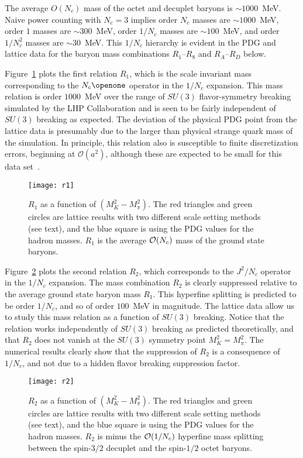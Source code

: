 \documentclass[twocolumn,nofootinbib,prd,aps,superscriptaddress,tightenlines]{revtex4}
\def\N{N_c}
\def\mc#1{{\mathcal{#1}}}
\begin{document}
The average $O(N_c)$ mass of the octet and decuplet baryons is $\sim\!1000$~MeV.  Naive power counting with $N_c=3$ implies order $N_c$ masses  are $\sim\! 1000$~MeV, order $1$ masses are $\sim\!300$~MeV,
order $1/N_c$ masses are $\sim\!100$~MeV,  and order $1/N_c^2$ masses are $\sim\!30$~MeV.  This $1/N_c$ hierarchy is evident in the PDG and lattice data for the baryon mass combinations $R_1$--$R_8$ and $R_A$--$R_D$ below.

Figure~\ref{fig:r1} plots the first relation $R_1$, which is the scale invariant mass corresponding to the $N_c \openone$ operator in the $1/N_c$ expansion.  This mass relation is order $1000$~MeV over the range of $SU(3)$ flavor-symmetry breaking simulated by the LHP Collaboration and is seen to be fairly independent of $SU(3)$ breaking as expected.  The deviation of the physical PDG point from the lattice data is presumably due to the larger than physical strange quark mass
of the simulation.  In principle, this relation also is susceptible to finite discretization errors, beginning at $\mc{O}(a^2)$, although these are expected to be small for this data set~\cite{WalkerLoud:2008bp}.
\begin{figure}
\texttt{[image: r1]}
\caption{$R_1$ as a function of $(M_K^2 - M_\pi^2)$. The red triangles and green circles are lattice results with two different scale setting methods (see text), and the blue square is using the PDG values for the hadron masses. $R_1$ is the average ${\cal O}(N_c)$ mass of the ground state baryons. \label{fig:r1}}
\end{figure}


Figure~\ref{fig:r2} plots the second relation $R_2$, which corresponds to the $J^2/N_c$ operator in the $1/N_c$ expansion.  The mass combination $R_2$ is clearly suppressed relative to the average ground state baryon mass $R_1$. This hyperfine splitting is predicted to be order $1/\N$, and so of order $100$~MeV in magnitude. The lattice data allow us to study this mass relation as a function of $SU(3)$ breaking. Notice that the relation works independently of $SU(3)$ breaking as predicted theoretically, and that $R_2$ does not vanish at the $SU(3)$ symmetry point $M_K^2=M_\pi^2$. The numerical results clearly show that the suppression of $R_2$ is a consequence of $1/N_c$, and not due to a hidden flavor breaking suppression factor.
\begin{figure}
\texttt{[image: r2]}
\caption{$R_2$ as a function of $(M_K^2 - M_\pi^2)$. The red triangles and green circles are lattice results with two different scale setting methods (see text), and the blue square is using the PDG values for the hadron masses.  $R_2$ is minus the ${\cal O}(1/N_c)$ hyperfine mass splitting between the spin-$3/2$ decuplet and the spin-$1/2$ octet baryons. \label{fig:r2}}
\end{figure}
\end{document}
